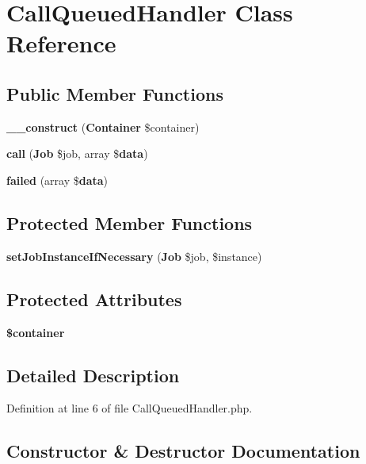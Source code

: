 \section{Call\+Queued\+Handler Class Reference}
\label{class_illuminate_1_1_events_1_1_call_queued_handler}
\subsection*{Public Member Functions}
\begin{DoxyCompactItemize}
\item 
{\bf \+\_\+\+\_\+construct} ({\bf Container} \$container)
\item 
{\bf call} ({\bf Job} \$job, array \${\bf data})
\item 
{\bf failed} (array \${\bf data})
\end{DoxyCompactItemize}
\subsection*{Protected Member Functions}
\begin{DoxyCompactItemize}
\item 
{\bf set\+Job\+Instance\+If\+Necessary} ({\bf Job} \$job, \$instance)
\end{DoxyCompactItemize}
\subsection*{Protected Attributes}
\begin{DoxyCompactItemize}
\item 
{\bf \$container}
\end{DoxyCompactItemize}


\subsection{Detailed Description}


Definition at line 6 of file Call\+Queued\+Handler.\+php.



\subsection{Constructor \& Destructor Documentation}
